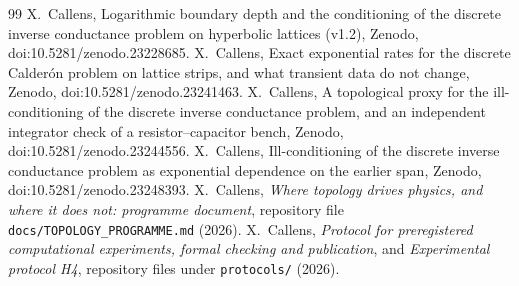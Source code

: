 \documentclass[11pt,a4paper]{article}
\begin{document}
\begin{thebibliography}{99}
 X.~Callens, Logarithmic boundary depth and the conditioning of the discrete inverse conductance problem on hyperbolic lattices (v1.2), Zenodo, doi:10.5281/zenodo.23228685.
 X.~Callens, Exact exponential rates for the discrete Calder\'on problem on lattice strips, and what transient data do not change, Zenodo, doi:10.5281/zenodo.23241463.
 X.~Callens, A topological proxy for the ill-conditioning of the discrete inverse conductance problem, and an independent integrator check of a resistor--capacitor bench, Zenodo, doi:10.5281/zenodo.23244556.
 X.~Callens, Ill-conditioning of the discrete inverse conductance problem as exponential dependence on the earlier span, Zenodo, doi:10.5281/zenodo.23248393.
 X.~Callens, \emph{Where topology drives physics, and where it does not: programme document}, repository file \texttt{docs/TOPOLOGY\_PROGRAMME.md} (2026).
 X.~Callens, \emph{Protocol for preregistered computational experiments, formal checking and publication}, and \emph{Experimental protocol H4}, repository files under \texttt{protocols/} (2026).
\end{thebibliography}
\end{document}
